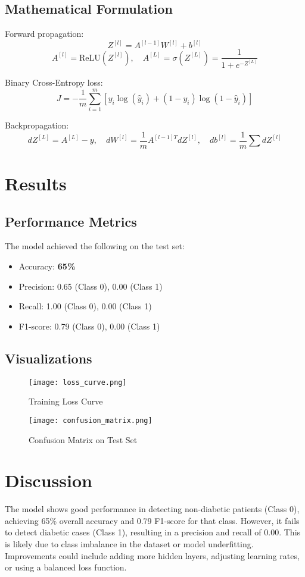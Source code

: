 \documentclass[12pt]{article}
\begin{document}
\subsection{Mathematical Formulation}
Forward propagation:
\[
Z^{[l]} = A^{[l-1]}W^{[l]} + b^{[l]}
\]
\[
A^{[l]} = \text{ReLU}(Z^{[l]}), \quad A^{[L]} = \sigma(Z^{[L]}) = \frac{1}{1 + e^{-Z^{[L]}}}
\]

Binary Cross-Entropy loss:
\[
J = -\frac{1}{m} \sum_{i=1}^m \left[ y_i \log(\hat{y}_i) + (1 - y_i) \log(1 - \hat{y}_i) \right]
\]

Backpropagation:
\[
dZ^{[L]} = A^{[L]} - y, \quad dW^{[l]} = \frac{1}{m} A^{[l-1]T} dZ^{[l]}, \quad db^{[l]} = \frac{1}{m} \sum dZ^{[l]}
\]

\section{Results}
\subsection{Performance Metrics}
The model achieved the following on the test set:
\begin{itemize}
    \item Accuracy: \textbf{65\%}
    \item Precision: 0.65 (Class 0), 0.00 (Class 1)
    \item Recall: 1.00 (Class 0), 0.00 (Class 1)
    \item F1-score: 0.79 (Class 0), 0.00 (Class 1)
\end{itemize}

\subsection{Visualizations}

\begin{figure}[h!]
\centering
\texttt{[image: loss\_curve.png]}
\caption{Training Loss Curve}
\end{figure}

\begin{figure}[h!]
\centering
\texttt{[image: confusion\_matrix.png]}
\caption{Confusion Matrix on Test Set}
\end{figure}

\section{Discussion}
The model shows good performance in detecting non-diabetic patients (Class 0), achieving 65\% overall accuracy and 0.79 F1-score for that class. However, it fails to detect diabetic cases (Class 1), resulting in a precision and recall of 0.00. This is likely due to class imbalance in the dataset or model underfitting. Improvements could include adding more hidden layers, adjusting learning rates, or using a balanced loss function.
\end{document}
